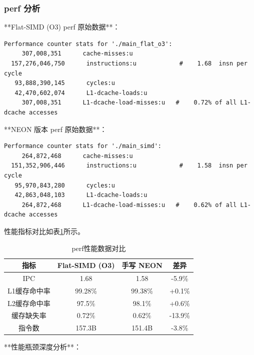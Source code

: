 \documentclass[a4paper]{article}
\begin{document}
\subsubsection{perf 分析}

**Flat-SIMD (O3) perf 原始数据**：

\begin{lstlisting}[frame=single, basicstyle=\ttfamily\scriptsize]
Performance counter stats for './main_flat_o3':
     307,008,351      cache-misses:u
  157,276,046,750      instructions:u            #    1.68  insn per cycle
   93,888,390,145      cycles:u
   42,470,602,074      L1-dcache-loads:u
     307,008,351      L1-dcache-load-misses:u   #    0.72% of all L1-dcache accesses
\end{lstlisting}

**NEON 版本 perf 原始数据**：

\begin{lstlisting}[frame=single, basicstyle=\ttfamily\scriptsize]
Performance counter stats for './main_simd':
     264,872,468      cache-misses:u
  151,352,906,446      instructions:u            #    1.58  insn per cycle
   95,970,843,280      cycles:u
   42,863,048,103      L1-dcache-loads:u
     264,872,468      L1-dcache-load-misses:u   #    0.62% of all L1-dcache accesses
\end{lstlisting}

性能指标对比如表\ref{table:perf}所示。

\begin{table}[!htbp]
  \centering
  \begin{tabular}{cccc}
  \toprule  
  \textbf{指标} & \textbf{Flat-SIMD (O3)} & \textbf{手写 NEON} & \textbf{差异} \\
  \midrule
  IPC & 1.68 & 1.58 & -5.9\% \\
  L1缓存命中率 & 99.28\% & 99.38\% & +0.1\% \\
  L2缓存命中率 & 97.5\% & 98.1\% & +0.6\% \\
  缓存缺失率 & 0.72\% & 0.62\% & -13.9\% \\
  指令数 & 157.3B & 151.4B & -3.8\% \\
  \bottomrule
  \end{tabular}
  \caption{perf性能数据对比}
  \label{table:perf}
\end{table}

**性能瓶颈深度分析**：
\end{document}
